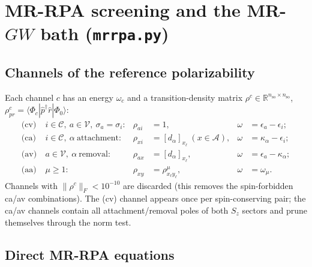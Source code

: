 \documentclass[11pt,a4paper]{article}
\newcommand{\braket}[1]{\langle#1\rangle}
\newcommand{\code}[1]{\texttt{#1}}
\newcommand{\so}{\mathrm{so}}
\begin{document}
\section{MR-RPA screening and the MR-$GW$ bath (\code{mrrpa.py})}
\label{sec:mrrpa}

\subsection{Channels of the reference polarizability}

Each channel $c$ has an energy $\omega_c$ and a transition-density matrix
$\rho^c\in\mathbb R^{n_{\so}\times n_{\so}}$, $\rho^c_{pr}=\braket{\Phi_c|\hat p^\dagger\hat r|\Phi_0}$:
\begin{align}
  \text{(cv)}&\ i\in\mathcal C,\ a\in\mathcal V,\ \sigma_a=\sigma_i: & \rho_{ai}&=1, & \omega&=\epsilon_a-\epsilon_i;\\
  \text{(ca)}&\ i\in\mathcal C,\ \alpha\ \text{attachment}: & \rho_{x i}&=[d_\alpha]_{x_\ell}\ (x\in\mathcal A), & \omega&=\kappa_\alpha-\epsilon_i;\\
  \text{(av)}&\ a\in\mathcal V,\ \alpha\ \text{removal}: & \rho_{a x}&=[d_\alpha]_{x_\ell}, & \omega&=\epsilon_a-\kappa_\alpha;\\
  \text{(aa)}&\ \mu\ge1: & \rho_{xy}&=\rho^\mu_{x_\ell y_\ell}, & \omega&=\omega_\mu .
  \label{eq:channels}
\end{align}
Channels with $\|\rho^c\|_F<10^{-10}$ are discarded (this removes the
spin-forbidden ca/av combinations).  The (cv) channel appears once per
spin-conserving pair; the ca/av channels contain all attachment/removal poles
of both $S_z$ sectors and prune themselves through the norm test.

\subsection{Direct MR-RPA equations}
\end{document}
